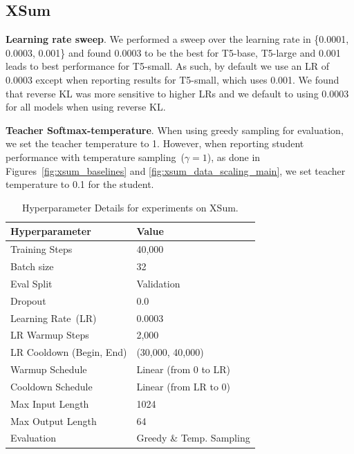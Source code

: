 \documentclass{article} %
\begin{document}
\subsection{XSum}
\label{app:xsum}


\textbf{Learning rate sweep}. We performed a sweep over the learning rate in \{0.0001, 0.0003, 0.001\} and found 0.0003 to be the best for T5-base, T5-large and 0.001 leads to best performance for T5-small. As such, by default we use an LR of 0.0003 except when reporting results for T5-small, which uses 0.001. We found that reverse KL was more sensitive to higher LRs and we default to using 0.0003 for all models when using reverse KL.

\textbf{Teacher Softmax-temperature}. When using greedy sampling for evaluation, we set the teacher temperature to 1. However, when reporting student performance with temperature sampling~($\gamma=1$), as done in Figures~\ref{fig:xsum_baselines} and \ref{fig:xsum_data_scaling_main}, we set teacher temperature to 0.1 for the student. %

\begin{table}[h]
    \centering
    \caption{Hyperparameter Details for experiments on XSum.}
    \begin{tabularx}{0.65\textwidth}{lX}
        \toprule
        \textbf{Hyperparameter} & \textbf{Value} \\
        \midrule
        Training Steps & 40,000 \\
        Batch size & 32 \\
        Eval Split & Validation \\
        Dropout & 0.0 \\
        Learning Rate~(LR) & 0.0003\\
        LR Warmup Steps & 2,000 \\
        LR Cooldown (Begin, End) & (30,000, 40,000) \\
        Warmup Schedule & Linear (from 0 to LR)\\
        Cooldown Schedule & Linear (from LR to 0)\\
        Max Input Length & 1024 \\
        Max Output Length & 64 \\
        Evaluation & Greedy \& Temp. Sampling \\
        \bottomrule
    \end{tabularx}
    \label{tab:hparams_xsum}
\end{table}
\end{document}
